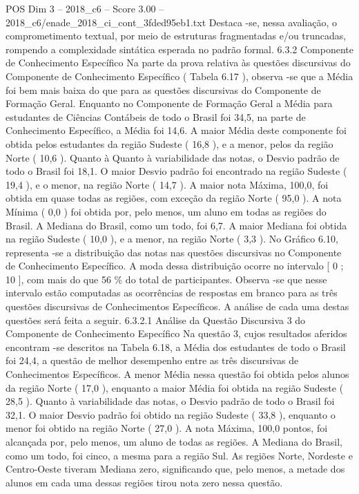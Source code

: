 \begin{textsample}{POS Dim 3 – 2018\_c6 – Score 3.00 – 2018\_c6/enade\_2018\_ci\_cont\_3fded95eb1.txt}
Destaca -se, nessa avaliação, o comprometimento textual, por meio de estruturas fragmentadas e/ou truncadas, rompendo a complexidade sintática esperada no padrão formal. 6.3.2 Componente de Conhecimento Específico Na parte da prova relativa às questões discursivas do Componente de Conhecimento Específico ( Tabela 6.17 ), observa -se que a Média foi bem mais baixa do que para as questões discursivas do Componente de Formação Geral.
Enquanto no Componente de Formação Geral a Média para estudantes de Ciências Contábeis de todo o Brasil foi 34,5, na parte de Conhecimento Específico, a Média foi 14,6.
A maior Média deste componente foi obtida pelos estudantes da região Sudeste ( 16,8 ), e a menor, pelos da região Norte ( 10,6 ).
Quanto à Quanto à variabilidade das notas, o Desvio padrão de todo o Brasil foi 18,1.
O maior Desvio padrão foi encontrado na região Sudeste ( 19,4 ), e o menor, na região Norte ( 14,7 ).
A maior nota Máxima, 100,0, foi obtida em quase todas as regiões, com exceção da região Norte ( 95,0 ).
A nota Mínima ( 0,0 ) foi obtida por, pelo menos, um aluno em todas as regiões do Brasil.
A Mediana do Brasil, como um todo, foi 6,7.
A maior Mediana foi obtida na região Sudeste ( 10,0 ), e a menor, na região Norte ( 3,3 ).
No Gráfico 6.10, representa -se a distribuição das notas nas questões discursivas no Componente de Conhecimento Específico.
A moda dessa distribuição ocorre no intervalo [ 0 ; 10 ], com mais do que 56 \% do total de participantes.
Observa -se que nesse intervalo estão computadas as ocorrências de respostas em branco para as três questões discursivas de Conhecimentos Específicos.
A análise de cada uma destas questões será feita a seguir. 6.3.2.1 Análise da Questão Discursiva 3 do Componente de Conhecimento Específico Na questão 3, cujos resultados aferidos encontram -se descritos na Tabela 6.18, a Média dos estudantes de todo o Brasil foi 24,4, a questão de melhor desempenho entre as três discursivas de Conhecimentos Específicos.
A menor Média nessa questão foi obtida pelos alunos da região Norte ( 17,0 ), enquanto a maior Média foi obtida na região Sudeste ( 28,5 ).
Quanto à variabilidade das notas, o Desvio padrão de todo o Brasil foi 32,1.
O maior Desvio padrão foi obtido na região Sudeste ( 33,8 ), enquanto o menor foi obtido na região Norte ( 27,0 ).
A nota Máxima, 100,0 pontos, foi alcançada por, pelo menos, um aluno de todas as regiões.
A Mediana do Brasil, como um todo, foi cinco, a mesma para a região Sul.
As regiões Norte, Nordeste e Centro-Oeste tiveram Mediana zero, significando que, pelo menos, a metade dos alunos em cada uma dessas regiões tirou nota zero nessa questão.

\end{textsample}
